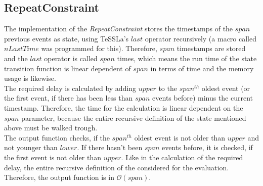 \subsection{RepeatConstraint}
	The implementation of the \emph{RepeatConstraint} stores the timestamps of the $span$ previous events as state, using TeSSLa's $last$ operator recursively (a macro called $nLastTime$ was programmed for this). Therefore, $span$ timestamps are stored and the $last$ operator is called $span$ times, which means the run time of the state transition function is linear dependent of $span$ in terms of time and the memory usage is likewise.\\
	The required delay is calculated by adding $upper$ to the  $span^{th}$ oldest event (or the first event, if there has been less than $span$ events before) minus the current timestamp. Therefore, the time for the calculation is linear dependent on the $span$ parameter, because the entire recursive definition of the state mentioned above must be walked trough.\\
	The output function checks, if the $span^{th}$ oldest event is not older than $upper$ and not younger than $lower$. If there hasn't been $span$ events before, it is checked, if the first event is not older than $upper$. Like in the calculation of the required delay, the entire recursive definition of the considered for the evaluation. Therefore, the output function is in $\mathcal{O}(span)$.
	
